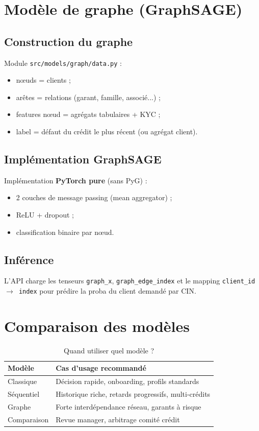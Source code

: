 \section{Modèle de graphe (GraphSAGE)}

\subsection{Construction du graphe}

Module \texttt{src/models/graph/data.py} :
\begin{itemize}[leftmargin=*]
  \item nœuds = clients ;
  \item arêtes = relations (garant, famille, associé...) ;
  \item features nœud = agrégats tabulaires + KYC ;
  \item label = défaut du crédit le plus récent (ou agrégat client).
\end{itemize}

\subsection{Implémentation GraphSAGE}

Implémentation \textbf{PyTorch pure} (sans PyG) :
\begin{itemize}[leftmargin=*]
  \item 2 couches de message passing (mean aggregator) ;
  \item ReLU + dropout ;
  \item classification binaire par nœud.
\end{itemize}

\subsection{Inférence}

L'API charge les tenseurs \texttt{graph\_x}, \texttt{graph\_edge\_index} et le mapping \texttt{client\_id $\rightarrow$ index} pour prédire la proba du client demandé par CIN.

\section{Comparaison des modèles}

\begin{table}[H]
  \centering
  \caption{Quand utiliser quel modèle ?}
  \begin{tabular}{|p{3cm}|p{10cm}|}
    \hline
    \textbf{Modèle} & \textbf{Cas d'usage recommandé} \\
    \hline
    Classique & Décision rapide, onboarding, profils standards \\
    \hline
    Séquentiel & Historique riche, retards progressifs, multi-crédits \\
    \hline
    Graphe & Forte interdépendance réseau, garants à risque \\
    \hline
    Comparaison & Revue manager, arbitrage comité crédit \\
    \hline
  \end{tabular}
\end{table}


